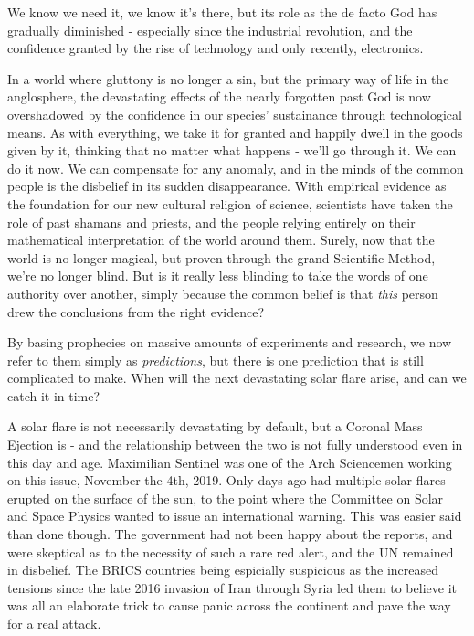We know we need it, we know it's there, but its role as the de facto God has gradually diminished - especially since the industrial revolution, and the confidence granted by the rise of technology and only recently, electronics. 

In a world where gluttony is no longer a sin, but the primary way of life in the anglosphere, the devastating effects of the nearly forgotten past God is now overshadowed by the confidence in our species' sustainance through technological means. As with everything, we take it for granted and happily dwell in the goods given by it, thinking that no matter what happens - we'll go through it. We can do it now. We can compensate for any anomaly, and in the minds of the common people is the disbelief in its sudden disappearance. With empirical evidence as the foundation for our new cultural religion of science, scientists have taken the role of past shamans and priests, and the people relying entirely on their mathematical interpretation of the world around them. Surely, now that the world is no longer magical, but proven through the grand Scientific Method, we're no longer blind. But is it really less blinding to take the words of one authority over another, simply because the common belief is that \textit{this} person drew the conclusions from the right evidence?

By basing prophecies on massive amounts of experiments and research, we now refer to them simply as \textit{predictions}, but there is one prediction that is still complicated to make. When will the next devastating solar flare arise, and can we catch it in time? 

A solar flare is not necessarily devastating by default, but a Coronal Mass Ejection is - and the relationship between the two is not fully understood even in this day and age. Maximilian Sentinel was one of the Arch Sciencemen working on this issue, November the 4th, 2019. Only days ago had multiple solar flares erupted on the surface of the sun, to the point where the Committee on Solar and Space Physics wanted to issue an international warning. This was easier said than done though. The government had not been happy about the reports, and were skeptical as to the necessity of such a rare red alert, and the UN remained in disbelief. The BRICS countries being espicially suspicious as the increased tensions since the late 2016 invasion of Iran through Syria led them to believe it was all an elaborate trick to cause panic across the continent and pave the way for a real attack.

